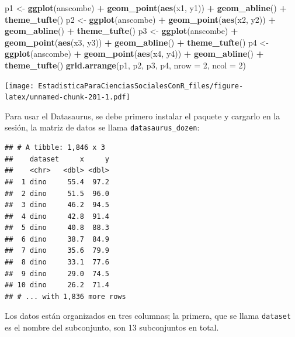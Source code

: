 \documentclass[]{book}
\newenvironment{Shaded}{\begin{snugshade}}{\end{snugshade}}
\newcommand{\DataTypeTok}[1]{\textcolor[rgb]{0.13,0.29,0.53}{#1}}
\newcommand{\DecValTok}[1]{\textcolor[rgb]{0.00,0.00,0.81}{#1}}
\newcommand{\KeywordTok}[1]{\textcolor[rgb]{0.13,0.29,0.53}{\textbf{#1}}}
\newcommand{\NormalTok}[1]{#1}
\newcommand{\OperatorTok}[1]{\textcolor[rgb]{0.81,0.36,0.00}{\textbf{#1}}}
\newcommand{\StringTok}[1]{\textcolor[rgb]{0.31,0.60,0.02}{#1}}
\begin{document}
\begin{Shaded}
\begin{Highlighting}[]
\NormalTok{p1 <-}\StringTok{ }\KeywordTok{ggplot}\NormalTok{(anscombe) }\OperatorTok{+}\StringTok{ }\KeywordTok{geom_point}\NormalTok{(}\KeywordTok{aes}\NormalTok{(x1, y1)) }\OperatorTok{+}\StringTok{ }\KeywordTok{geom_abline}\NormalTok{() }\OperatorTok{+}\StringTok{ }\KeywordTok{theme_tufte}\NormalTok{()}
\NormalTok{p2 <-}\StringTok{ }\KeywordTok{ggplot}\NormalTok{(anscombe) }\OperatorTok{+}\StringTok{ }\KeywordTok{geom_point}\NormalTok{(}\KeywordTok{aes}\NormalTok{(x2, y2)) }\OperatorTok{+}\StringTok{ }\KeywordTok{geom_abline}\NormalTok{() }\OperatorTok{+}\StringTok{ }\KeywordTok{theme_tufte}\NormalTok{()}
\NormalTok{p3 <-}\StringTok{ }\KeywordTok{ggplot}\NormalTok{(anscombe) }\OperatorTok{+}\StringTok{ }\KeywordTok{geom_point}\NormalTok{(}\KeywordTok{aes}\NormalTok{(x3, y3)) }\OperatorTok{+}\StringTok{ }\KeywordTok{geom_abline}\NormalTok{() }\OperatorTok{+}\StringTok{ }\KeywordTok{theme_tufte}\NormalTok{()}
\NormalTok{p4 <-}\StringTok{ }\KeywordTok{ggplot}\NormalTok{(anscombe) }\OperatorTok{+}\StringTok{ }\KeywordTok{geom_point}\NormalTok{(}\KeywordTok{aes}\NormalTok{(x4, y4)) }\OperatorTok{+}\StringTok{ }\KeywordTok{geom_abline}\NormalTok{() }\OperatorTok{+}\StringTok{ }\KeywordTok{theme_tufte}\NormalTok{()}
\KeywordTok{grid.arrange}\NormalTok{(p1, p2, p3, p4, }\DataTypeTok{nrow =} \DecValTok{2}\NormalTok{, }\DataTypeTok{ncol =} \DecValTok{2}\NormalTok{)}
\end{Highlighting}
\end{Shaded}

\texttt{[image: EstadisticaParaCienciasSocialesConR\_files/figure-latex/unnamed-chunk-201-1.pdf]}

Para usar el Datasaurus, se debe primero instalar el paquete y cargarlo en la sesión, la matriz de datos se llama \texttt{datasaurus\_dozen}:

\begin{verbatim}
## # A tibble: 1,846 x 3
##    dataset     x     y
##    <chr>   <dbl> <dbl>
##  1 dino     55.4  97.2
##  2 dino     51.5  96.0
##  3 dino     46.2  94.5
##  4 dino     42.8  91.4
##  5 dino     40.8  88.3
##  6 dino     38.7  84.9
##  7 dino     35.6  79.9
##  8 dino     33.1  77.6
##  9 dino     29.0  74.5
## 10 dino     26.2  71.4
## # ... with 1,836 more rows
\end{verbatim}

Los datos están organizados en tres columnas; la primera, que se llama \texttt{dataset} es el nombre del subconjunto, son 13 subconjuntos en total.
\end{document}
